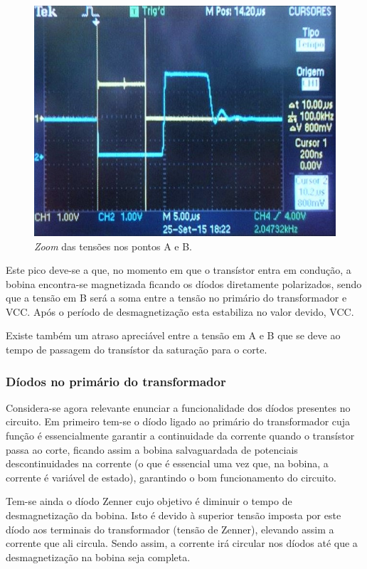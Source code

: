 \documentclass[a4paper,11pt]{article}
\numberwithin{equation}{section}
\begin{document}
\begin{figure}[h]
	\centering
	\includegraphics[keepaspectratio=true, scale=0.6]{img/fig5}
	\caption{\textit{Zoom} das tensões nos pontos A e B.}
	\label{fig:photo 2}
	\vspace{-0.8em}
\end{figure}

Este pico deve-se a que, no momento em que o transístor entra em condução, a bobina encontra-se magnetizada ficando os díodos diretamente polarizados, sendo que a tensão em B será a soma entre a tensão no primário do transformador e VCC. Após o período de desmagnetização esta estabiliza no valor devido, VCC. 

Existe também um atraso apreciável entre a tensão em A e B que se deve ao tempo de passagem do transístor da saturação para o corte.

\subsubsection{Díodos no primário do transformador}

Considera-se agora relevante enunciar a funcionalidade dos díodos presentes no circuito. Em primeiro tem-se o díodo ligado ao primário do transformador cuja função é essencialmente garantir a continuidade da corrente quando o transístor passa ao corte, ficando assim a bobina salvaguardada de potenciais descontinuidades na corrente (o que é essencial uma vez que, na bobina, a corrente é variável de estado), garantindo o bom funcionamento do circuito. 

Tem-se ainda o díodo Zenner cujo objetivo é diminuir o tempo de desmagnetização da bobina. Isto é devido à superior tensão imposta por este díodo aos terminais do transformador (tensão de Zenner), elevando assim a corrente que ali circula. Sendo assim, a corrente irá circular nos díodos até que a desmagnetização na bobina seja completa. 
\end{document}
